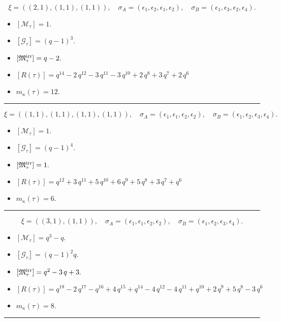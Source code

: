 \documentclass[10pt,a4paper]{amsart}
\begin{document}
$$\xi = ({(2, 1), (1, 1), (1, 1)}),\quad \sigma_A = ({{\epsilon_1, \epsilon_2}, {\epsilon_1}, {\epsilon_2}}),\quad \sigma_B = ({{\epsilon_1, \epsilon_3}, {\epsilon_2}, {\epsilon_4}}).$$

\begin{itemize}
 \item $[\mathcal{M}_{\tau}] = 1 .$

 \item $[\mathcal{G}_{\tau}] = {\left(q - 1\right)}^{3} .$

 \item $[{\frak M}_{\tau}^{\textrm{irr}}] = q - 2 .$

 \item $[R(\tau)] = q^{14} - 2 \, q^{12} - 3 \, q^{11} - 3 \, q^{10} + 2 \, q^{8} + 3 \, q^{7} + 2 \, q^{6} $

 \item $m_{\kappa}(\tau) = 12 .$

 \end{itemize}
\noindent\rule{8cm}{0.4pt}

$$\xi = ({(1, 1), (1, 1), (1, 1), (1, 1)}),\quad \sigma_A = ({{\epsilon_1}, {\epsilon_1}, {\epsilon_2}, {\epsilon_2}}),\quad \sigma_B = ({{\epsilon_1}, {\epsilon_2}, {\epsilon_3}, {\epsilon_4}}).$$

\begin{itemize}
 \item $[\mathcal{M}_{\tau}] = 1 .$

 \item $[\mathcal{G}_{\tau}] = {\left(q - 1\right)}^{4} .$

 \item $[{\frak M}_{\tau}^{\textrm{irr}}] = 1 .$

 \item $[R(\tau)] = q^{12} + 3 \, q^{11} + 5 \, q^{10} + 6 \, q^{9} + 5 \, q^{8} + 3 \, q^{7} + q^{6} $

 \item $m_{\kappa}(\tau) = 6 .$

 \end{itemize}
\noindent\rule{8cm}{0.4pt}

$$\xi = ({(3, 1)}, {(1, 1)}),\quad \sigma_A = ({{\epsilon_1, \epsilon_1, \epsilon_2}}, {{\epsilon_2}}),\quad \sigma_B = ({{\epsilon_1, \epsilon_2, \epsilon_3}}, {{\epsilon_4}}).$$

\begin{itemize}
 \item $[\mathcal{M}_{\tau}] = q^{3} - q .$

 \item $[\mathcal{G}_{\tau}] = {\left(q - 1\right)}^{2} q .$

 \item $[{\frak M}_{\tau}^{\textrm{irr}}] = q^{2} - 3 \, q + 3 .$

 \item $[R(\tau)] = q^{18} - 2 \, q^{17} - q^{16} + 4 \, q^{15} + q^{14} - 4 \, q^{12} - 4 \, q^{11} + q^{10} + 2 \, q^{9} + 5 \, q^{8} - 3 \, q^{6} $

 \item $m_{\kappa}(\tau) = 8 .$

 \end{itemize}
\noindent\rule{8cm}{0.4pt}
\end{document}
